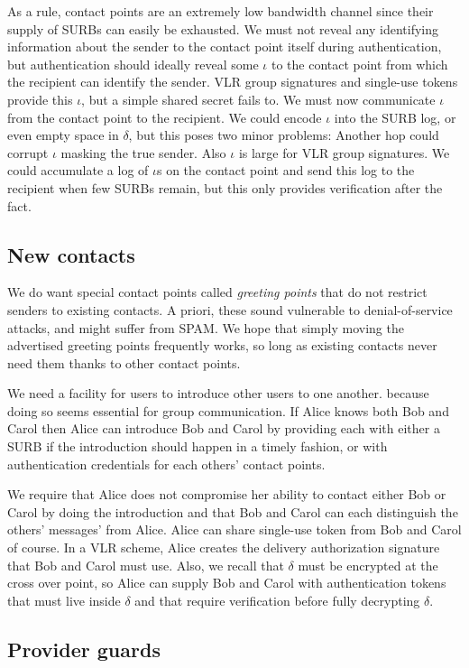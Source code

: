 As a rule, contact points are an extremely low bandwidth channel
since their supply of SURBs can easily be exhausted.  We must not
reveal any identifying information about the sender to the contact 
point itself during authentication, but authentication should ideally
reveal some $\iota$ to the contact point from which the recipient
can identify the sender.  VLR group signatures and single-use tokens
provide this $\iota$, but a simple shared secret fails to.  We must
now communicate $\iota$ from the contact point to the recipient. 
We could encode $\iota$ into the SURB log, or even empty space in
$\delta$, but this poses two minor problems: 
 Another hop could corrupt $\iota$ masking the true sender.
 Also $\iota$ is large for VLR group signatures.  
We could accumulate a log of $\iota$s on the contact point and send
this log to the recipient when few SURBs remain, but this only
provides verification after the fact.



\subsection{New contacts}

We do want special contact points called {\em greeting points} that
do not restrict senders to existing contacts.  A priori, these sound
vulnerable to denial-of-service attacks, and might suffer from SPAM.
We hope that simply moving the advertised greeting points frequently
works, so long as existing contacts never need them thanks to other
contact points.

We need a facility for users to introduce other users to one another.
because doing so seems essential for group communication.  If Alice 
knows both Bob and Carol then Alice can introduce Bob and Carol by
providing each with either a SURB if the introduction should happen
in a timely fashion, or with authentication credentials for each
others' contact points.  

We require that Alice does not compromise her ability to contact
either Bob or Carol by doing the introduction and that Bob and Carol
can each distinguish the others' messages' from Alice. 
Alice can share single-use token from Bob and Carol of course.
In a VLR scheme, Alice creates the delivery authorization signature
that Bob and Carol must use.
Also, we recall that $\delta$ must be encrypted at the cross over
point, so Alice can supply Bob and Carol with authentication tokens 
that must live inside $\delta$ and that require verification before
fully decrypting $\delta$.  



\subsection{Provider guards}





